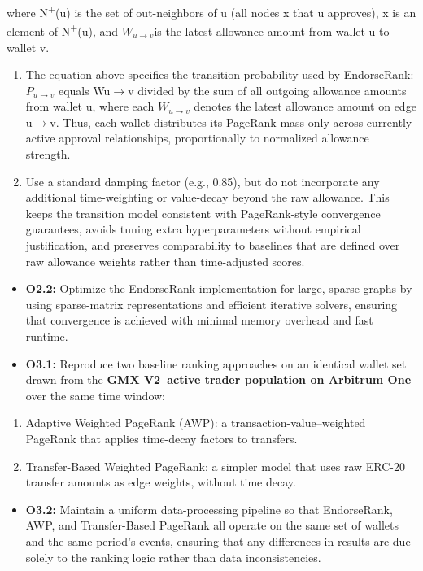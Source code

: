 where N\textsuperscript{+}(u) is the set of out-neighbors of u (all nodes x that u approves), x is an element of N\textsuperscript{+}(u), and $W_{u\to v}$is the latest allowance amount from wallet u to wallet v.


\begin{enumerate}
\item[(b)] The equation above specifies the transition probability used by EndorseRank: $P_{u\to v}$ equals Wu\(\to\)v divided by the sum of all outgoing allowance amounts from wallet u, where each $W_{u\to v}$ denotes the latest allowance amount on edge u\(\to\)v. Thus, each wallet distributes its PageRank mass only across currently active approval relationships, proportionally to normalized allowance strength.
\item[(c)] Use a standard damping factor (e.g., 0.85), but do not incorporate any additional time-weighting or value-decay beyond the raw allowance. This keeps the transition model consistent with PageRank-style convergence guarantees, avoids tuning extra hyperparameters without empirical justification, and preserves comparability to baselines that are defined over raw allowance weights rather than time-adjusted scores.
\end{enumerate}
\begin{itemize}
\item[\textbullet] \textbf{O2.2: }Optimize the EndorseRank implementation for large, sparse graphs by using sparse-matrix representations and efficient iterative solvers, ensuring that convergence is achieved with minimal memory overhead and fast runtime.
\end{itemize}

\begin{itemize}
\item[\textbullet] \textbf{O3.1: }Reproduce two baseline ranking approaches on an identical wallet set drawn from the \textbf{GMX V2--active trader population on Arbitrum One} over the same time window:
\end{itemize}
\begin{enumerate}
\item[(a)] Adaptive Weighted PageRank (AWP): a transaction-value--weighted PageRank that applies time-decay factors to transfers.
\item[(b)] Transfer-Based Weighted PageRank: a simpler model that uses raw ERC-20 transfer amounts as edge weights, without time decay.
\end{enumerate}
\begin{itemize}
\item[\textbullet] \textbf{O3.2: }Maintain a uniform data-processing pipeline so that EndorseRank, AWP, and Transfer-Based PageRank all operate on the same set of wallets and the same period's events, ensuring that any differences in results are due solely to the ranking logic rather than data inconsistencies.
\end{itemize}

